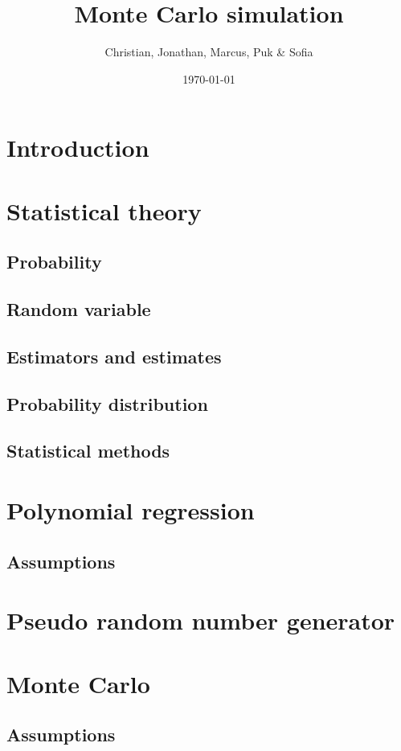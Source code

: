 \documentclass{article}
\title{Monte Carlo simulation}
\author{Christian, Jonathan, Marcus, Puk \& Sofia }
\date{\today}
\begin{document}
	\maketitle
	\newpage
	\tableofcontents
	\newpage
	\section{Introduction}
	
	\newpage
	\section{Statistical theory}
	\subsection{Probability}
	\subsection{Random variable}
	\subsection{Estimators and estimates}
	\subsection{Probability distribution}
	\subsection{Statistical methods}
	\newpage
	\section{Polynomial regression}
 	
	\subsection{Assumptions}
	\newpage
	\section{Pseudo random number generator}
	\newpage
	\section{Monte Carlo}
	\subsection{Assumptions}
	\newpage
\end{document}
